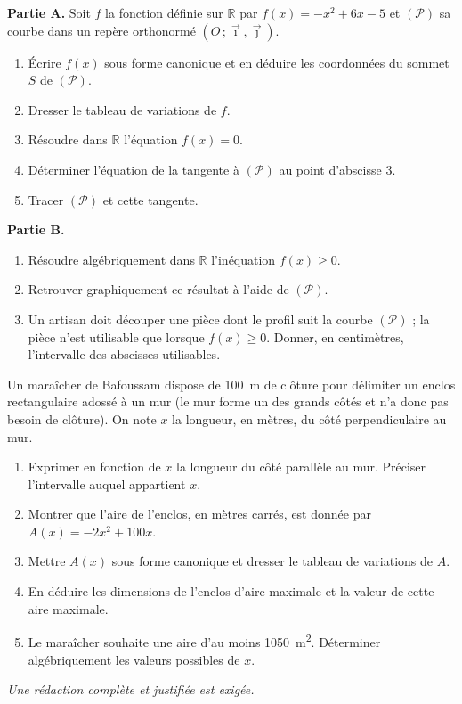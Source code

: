 \documentclass[11pt]{article}
\begin{document}
\begin{exercice}
\textbf{Partie A.} Soit $f$ la fonction définie sur $\mathbb{R}$ par $f(x)=-x^2+6x-5$ et $(\mathcal{P})$ sa courbe dans un repère orthonormé $(O\,;\vec{\imath},\vec{\jmath})$.
\begin{enumerate}
\item Écrire $f(x)$ sous forme canonique et en déduire les coordonnées du sommet $S$ de $(\mathcal{P})$.
\item Dresser le tableau de variations de $f$.
\item Résoudre dans $\mathbb{R}$ l'équation $f(x)=0$.
\item Déterminer l'équation de la tangente à $(\mathcal{P})$ au point d'abscisse $3$.
\item Tracer $(\mathcal{P})$ et cette tangente.
\end{enumerate}
\textbf{Partie B.}
\begin{enumerate}
\item Résoudre algébriquement dans $\mathbb{R}$ l'inéquation $f(x)\geq 0$.
\item Retrouver graphiquement ce résultat à l'aide de $(\mathcal{P})$.
\item Un artisan doit découper une pièce dont le profil suit la courbe $(\mathcal{P})$ ; la pièce n'est utilisable que lorsque $f(x)\geq 0$. Donner, en centimètres, l'intervalle des abscisses utilisables.
\end{enumerate}
\end{exercice}

\begin{exercice}
Un maraîcher de Bafoussam dispose de \SI{100}{m} de clôture pour délimiter un enclos rectangulaire adossé à un mur (le mur forme un des grands côtés et n'a donc pas besoin de clôture). On note $x$ la longueur, en mètres, du côté perpendiculaire au mur.
\begin{enumerate}
\item Exprimer en fonction de $x$ la longueur du côté parallèle au mur. Préciser l'intervalle auquel appartient $x$.
\item Montrer que l'aire de l'enclos, en mètres carrés, est donnée par $A(x)=-2x^2+100x$.
\item Mettre $A(x)$ sous forme canonique et dresser le tableau de variations de $A$.
\item En déduire les dimensions de l'enclos d'aire maximale et la valeur de cette aire maximale.
\item Le maraîcher souhaite une aire d'au moins \SI{1050}{m^2}. Déterminer algébriquement les valeurs possibles de $x$.
\end{enumerate}
\emph{Une rédaction complète et justifiée est exigée.}
\end{exercice}
\end{document}
